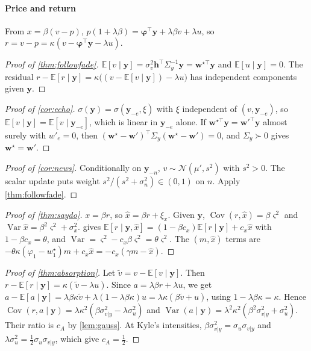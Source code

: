\documentclass[11pt,a4paper]{article}
\theoremstyle{sci}
\theoremstyle{scidef}
\newcommand{\E}{\mathbb{E}}
\newcommand{\N}{\mathcal{N}}
\newcommand{\w}{\bm{w}}
\newcommand{\y}{\bm{y}}
\newcommand{\h}{\bm{h}}
\newcommand{\bphi}{\bm{\varphi}}
\DeclareMathOperator{\Var}{Var}
\DeclareMathOperator{\Cov}{Cov}
\begin{document}
\paragraph{Price and return} From $x=\beta(v-p)$, $p(1+\lambda\beta)=\bphi^\top\y+\lambda\beta v+\lambda u$, so $r=v-p=\kappa(v-\bphi^\top\y-\lambda u)$.

\begin{proof}[Proof of \cref{thm:followfade}]
$\E[v\mid\y]=\sigma_v^2\h^\top\Sigma_y^{-1}\y=\w^{\star\top}\y$ and $\E[u\mid\y]=0$. The residual $r-\E[r\mid\y]=\kappa\big((v-\E[v\mid\y])-\lambda u\big)$ has independent components given $\y$.
\end{proof}

\begin{proof}[Proof of \cref{cor:echo}]
$\sigma(\y)=\sigma(\y_{-e},\xi)$ with $\xi$ independent of $(v,\y_{-e})$, so $\E[v\mid\y]=\E[v\mid\y_{-e}]$, which is linear in $\y_{-e}$ alone. If $\w^{\star\top}\y=\w'^\top\y$ almost surely with $w'_e=0$, then $(\w^\star-\w')^\top\Sigma_y(\w^\star-\w')=0$, and $\Sigma_y\succ0$ gives $\w^\star=\w'$.
\end{proof}

\begin{proof}[Proof of \cref{cor:news}]
Conditionally on $\y_{-n}$, $v\sim\N(\mu',s^2)$ with $s^2>0$. The scalar update puts weight $s^2/(s^2+\sigma_n^2)\in(0,1)$ on $n$. Apply \cref{thm:followfade}.
\end{proof}

\begin{proof}[Proof of \cref{thm:saydo}]
$x=\beta r$, so $\hat x=\beta r+\xi_x$. Given $\y$, $\Cov(r,\hat x)=\beta\varsigma^2$ and $\Var\hat x=\beta^2\varsigma^2+\sigma_x^2$.  gives $\E[r\mid\y,\hat x]=(1-\beta c_x)\E[r\mid\y]+c_x\hat x$ with $1-\beta c_x=\theta$, and $\Var=\varsigma^2-c_x\beta\varsigma^2=\theta\varsigma^2$. The $(m,\hat x)$ terms are $-\theta\kappa(\varphi_1-w^\star_1)m+c_x\hat x=-c_x(\gamma m-\hat x)$.
\end{proof}

\begin{proof}[Proof of \cref{thm:absorption}]
Let $\tilde v=v-\E[v\mid\y]$. Then $r-\E[r\mid\y]=\kappa(\tilde v-\lambda u)$. Since $a=\lambda\beta r+\lambda u$, we get $a-\E[a\mid\y]=\lambda\beta\kappa\tilde v+\lambda(1-\lambda\beta\kappa)u=\lambda\kappa(\beta\tilde v+u)$, using $1-\lambda\beta\kappa=\kappa$. Hence $\Cov(r,a\mid\y)=\lambda\kappa^2(\beta\sigma^2_{v|y}-\lambda\sigma_u^2)$ and $\Var(a\mid\y)=\lambda^2\kappa^2(\beta^2\sigma^2_{v|y}+\sigma_u^2)$. Their ratio is $c_A$ by \cref{lem:gauss}. At Kyle's intensities, $\beta\sigma^2_{v|y}=\sigma_u\sigma_{v|y}$ and $\lambda\sigma_u^2=\tfrac12\sigma_u\sigma_{v|y}$, which give $c_A=\tfrac12$.
\end{proof}
\end{document}
